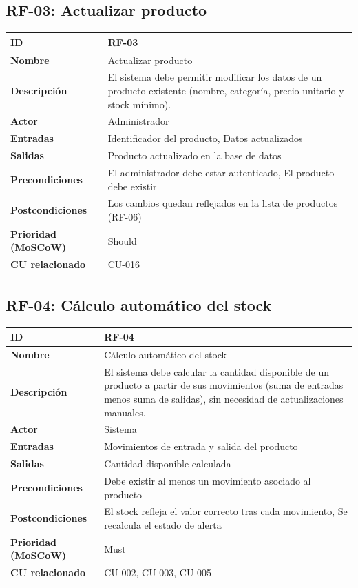 \documentclass[12pt, a4paper]{article}
\begin{document}
\subsection{RF-03: Actualizar producto}
\begin{center}
\renewcommand{\arraystretch}{1.4}
\begin{tabular}{|L{4cm}|L{12cm}|}
\hline
\textbf{ID} & RF-03 \\
\hline
\textbf{Nombre} & Actualizar producto \\
\hline
\textbf{Descripción} & El sistema debe permitir modificar los datos de un producto existente (nombre, categoría, precio unitario y stock mínimo). \\
\hline
\textbf{Actor} & Administrador \\
\hline
\textbf{Entradas} & Identificador del producto, Datos actualizados \\
\hline
\textbf{Salidas} & Producto actualizado en la base de datos \\
\hline
\textbf{Precondiciones} & El administrador debe estar autenticado, El producto debe existir \\
\hline
\textbf{Postcondiciones} & Los cambios quedan reflejados en la lista de productos (RF-06) \\
\hline
\textbf{Prioridad (MoSCoW)} & Should \\
\hline
\textbf{CU relacionado} & CU-016 \\
\hline
\end{tabular}
\end{center}

\subsection{RF-04: Cálculo automático del stock}
\begin{center}
\renewcommand{\arraystretch}{1.4}
\begin{tabular}{|L{4cm}|L{12cm}|}
\hline
\textbf{ID} & RF-04 \\
\hline
\textbf{Nombre} & Cálculo automático del stock \\
\hline
\textbf{Descripción} & El sistema debe calcular la cantidad disponible de un producto a partir de sus movimientos (suma de entradas menos suma de salidas), sin necesidad de actualizaciones manuales. \\
\hline
\textbf{Actor} & Sistema \\
\hline
\textbf{Entradas} & Movimientos de entrada y salida del producto \\
\hline
\textbf{Salidas} & Cantidad disponible calculada \\
\hline
\textbf{Precondiciones} & Debe existir al menos un movimiento asociado al producto \\
\hline
\textbf{Postcondiciones} & El stock refleja el valor correcto tras cada movimiento, Se recalcula el estado de alerta \\
\hline
\textbf{Prioridad (MoSCoW)} & Must \\
\hline
\textbf{CU relacionado} & CU-002, CU-003, CU-005 \\
\hline
\end{tabular}
\end{center}
\end{document}
